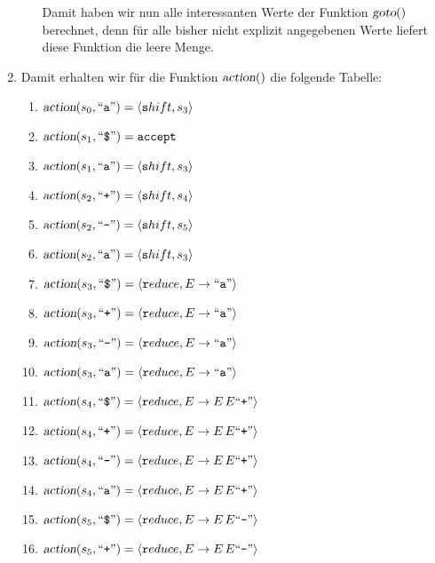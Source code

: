 \documentclass{article}
\def\pair(#1,#2){\langle #1, #2 \rangle}
\newcommand{\quoted}[1]{\mbox{``\texttt{#1}''}}
\def\pair(#1,#2){\langle #1, #2 \rangle}
\begin{document}
\begin{enumerate}
\begin{enumerate}
            Damit haben wir nun alle interessanten Werte der Funktion $\textsl{goto}()$ berechnet,
            denn f\"ur alle bisher nicht explizit angegebenen Werte liefert diese Funktion die leere Menge.
      \end{enumerate}

\item Damit erhalten wir f\"ur die Funktion $\textsl{action}()$ die folgende Tabelle:
      \begin{enumerate}
      \item $\textsl{action}(s_0, \quoted{a}) = \pair(\texttt{shift}, s_3)$
      \item $\textsl{action}(s_1, \quoted{\symbol{36}}) = \mathtt{accept}$
      \item $\textsl{action}(s_1, \quoted{a}) = \pair(\texttt{shift}, s_3)$
      \item $\textsl{action}(s_2, \quoted{+}) = \pair(\texttt{shift}, s_4)$
      \item $\textsl{action}(s_2, \quoted{-}) = \pair(\texttt{shift}, s_5)$
      \item $\textsl{action}(s_2, \quoted{a}) = \pair(\texttt{shift}, s_3)$
      \item $\textsl{action}(s_3, \quoted{\symbol{36}}) = \pair(\texttt{reduce}, E \rightarrow \quoted{a})$
      \item $\textsl{action}(s_3, \quoted{+}) = \pair(\texttt{reduce}, E \rightarrow \quoted{a})$
      \item $\textsl{action}(s_3, \quoted{-}) = \pair(\texttt{reduce}, E \rightarrow \quoted{a})$
      \item $\textsl{action}(s_3, \quoted{a}) = \pair(\texttt{reduce}, E \rightarrow \quoted{a})$
      \item $\textsl{action}(s_4, \quoted{\symbol{36}}) = \pair(\texttt{reduce}, E \rightarrow E\, E \quoted{+})$
      \item $\textsl{action}(s_4, \quoted{+}) = \pair(\texttt{reduce}, E \rightarrow E\, E \quoted{+})$
      \item $\textsl{action}(s_4, \quoted{-}) = \pair(\texttt{reduce}, E \rightarrow E\, E \quoted{+})$
      \item $\textsl{action}(s_4, \quoted{a}) = \pair(\texttt{reduce}, E \rightarrow E\, E \quoted{+})$
      \item $\textsl{action}(s_5, \quoted{\symbol{36}}) = \pair(\texttt{reduce}, E \rightarrow E\, E \quoted{-})$
      \item $\textsl{action}(s_5, \quoted{+}) = \pair(\texttt{reduce}, E \rightarrow E\, E \quoted{-})$

\end{enumerate}
\end{enumerate}
\end{document}
